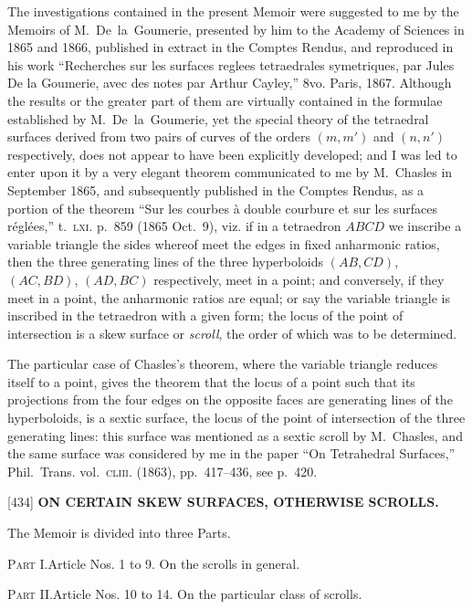 \documentclass[12pt,a4paper]{article}
\newcommand{\paperref}[1]{\textup{[#1]}}
\theoremstyle{definition}
\begin{document}
\normalsize
\setlength{\parindent}{1em}
The investigations contained in the present Memoir were suggested to me by the Memoirs of M.~De~la~Goumerie, presented by him to the Academy of Sciences in 1865 and 1866, published in extract in the Comptes Rendus, and reproduced in his work ``Recherches sur les surfaces reglees tetraedrales symetriques, par Jules De la Goumerie, avec des notes par Arthur Cayley,'' 8vo. Paris, 1867. Although the results or the greater part of them are virtually contained in the formulae established by M.~De~la~Goumerie, yet the special theory of the tetraedral surfaces derived from two pairs of curves of the orders $(m, m')$ and $(n, n')$ respectively, does not appear to have been explicitly developed; and I was led to enter upon it by a very elegant theorem communicated to me by M.~Chasles in September 1865, and subsequently published in the Comptes Rendus, as a portion of the theorem ``Sur les courbes \`a double courbure et sur les surfaces r\'egl\'ees,'' t.~\textsc{lxi}. p.~859 (1865 Oct.~9), viz. if in a tetraedron $ABCD$ we inscribe a variable triangle the sides whereof meet the edges in fixed anharmonic ratios, then the three generating lines of the three hyperboloids $(AB, CD)$, $(AC, BD)$, $(AD, BC)$ respectively, meet in a point; and conversely, if they meet in a point, the anharmonic ratios are equal; or say the variable triangle is inscribed in the tetraedron with a given form; the locus of the point of intersection is a skew surface or \textit{scroll}, the order of which was to be determined.

The particular case of Chasles's theorem, where the variable triangle reduces itself to a point, gives the theorem that the locus of a point such that its projections from the four edges on the opposite faces are generating lines of the hyperboloids, is a sextic surface, the locus of the point of intersection of the three generating lines: this surface was mentioned as a sextic scroll by M.~Chasles, and the same surface was considered by me in the paper ``On Tetrahedral Surfaces,'' Phil.~Trans. vol.~\textsc{cliii}. (1863), pp.~417--436, see p.~420.

\newpage
\setcounter{page}{56}

\noindent\paperref{434}\quad
\textbf{ON CERTAIN SKEW SURFACES, OTHERWISE SCROLLS.}

\smallskip
The Memoir is divided into three Parts.

\textsc{Part I.}\quad Article Nos. 1 to 9. On the scrolls in general.

\textsc{Part II.}\quad Article Nos. 10 to 14. On the particular class of scrolls.
\end{document}
